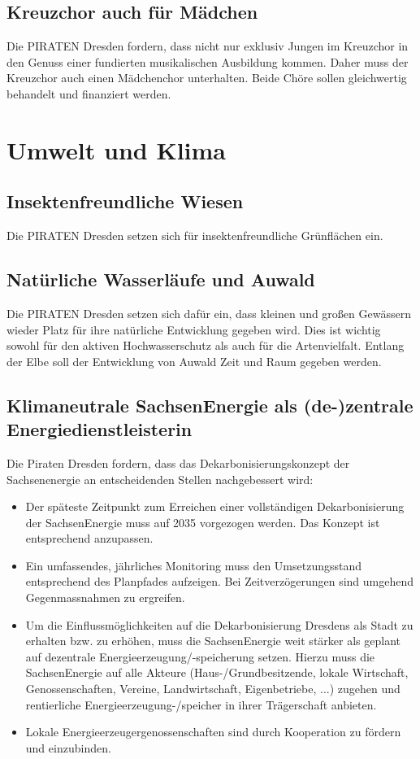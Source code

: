 \documentclass[a4paper, 11pt]{article}
\begin{document}
\subsection{Kreuzchor auch für Mädchen}
Die PIRATEN Dresden fordern, dass nicht nur exklusiv Jungen im Kreuzchor in den Genuss einer fundierten musikalischen Ausbildung kommen. Daher muss der Kreuzchor auch einen Mädchenchor unterhalten. Beide Chöre sollen gleichwertig behandelt und finanziert werden.


\section{Umwelt und Klima}

\subsection{Insektenfreundliche Wiesen}
Die PIRATEN Dresden setzen sich für insektenfreundliche Grünflächen ein.


\subsection{Natürliche Wasserläufe und Auwald}
Die PIRATEN Dresden setzen sich dafür ein, dass kleinen und großen Gewässern wieder Platz für ihre natürliche Entwicklung gegeben wird. Dies ist wichtig sowohl für den aktiven Hochwasserschutz als auch für die Artenvielfalt. Entlang der Elbe soll der Entwicklung von Auwald Zeit und Raum gegeben werden.


\subsection{Klimaneutrale SachsenEnergie als (de-)zentrale Energiedienstleisterin}
Die Piraten Dresden fordern, dass das Dekarbonisierungskonzept der Sachsenenergie an entscheidenden Stellen nachgebessert wird:

\begin{itemize}
    \item Der späteste Zeitpunkt zum Erreichen einer vollständigen Dekarbonisierung der SachsenEnergie muss auf 2035 vorgezogen werden. Das Konzept ist entsprechend anzupassen.
    \item Ein umfassendes, jährliches Monitoring muss den Umsetzungsstand entsprechend des Planpfades aufzeigen. Bei Zeitverzögerungen sind umgehend Gegenmassnahmen zu ergreifen.
    \item Um die Einflussmöglichkeiten auf die Dekarbonisierung Dresdens als Stadt zu erhalten bzw. zu erhöhen, muss die SachsenEnergie weit stärker als geplant auf dezentrale Energieerzeugung/-speicherung setzen. Hierzu muss die SachsenEnergie auf alle Akteure (Haus-/Grundbesitzende, lokale Wirtschaft, Genossenschaften, Vereine, Landwirtschaft, Eigenbetriebe, ...) zugehen und rentierliche Energieerzeugung-/speicher in ihrer Trägerschaft anbieten.
    \item Lokale Energieerzeugergenossenschaften sind durch Kooperation zu fördern und einzubinden.
\end{itemize}
\end{document}
